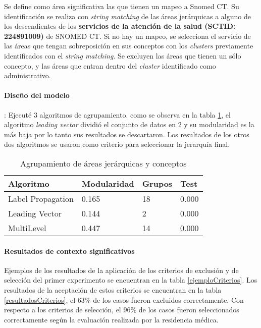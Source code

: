 Se define como área significativa las que tienen un mapeo a Snomed CT. Su identificación se realiza con \textit{string matching} de las áreas jerárquicas a  alguno de los descendientes de  los \textbf{servicios de la atención de la salud (SCTID: 224891009)} de SNOMED CT. Si no hay un mapeo, se selecciona el servicio de las áreas que tengan sobreposición en sus conceptos con los \textit{clusters} previamente identificados con el \textit{string matching}. Se excluyen las áreas que tienen un sólo concepto, y las áreas que entran dentro del \textit{cluster} identificado como administrativo. 

\paragraph{Diseño del modelo}: Ejecuté 3 algoritmos de agrupamiento. como se observa en la tabla \ref{clusteringAreas}, el algoritmo \textit{leading vector} dividió el conjunto de datos en 2 y su modularidad es la más baja por lo tanto sus resultados se descartaron.  Los resultados de los otros dos algoritmos se usaron como criterio para seleccionar la jerarquía final.

\begin{table}[htb]
\centering
\caption{Agrupamiento de áreas jerárquicas y conceptos}
\label{clusteringAreas}
\begin{tabular}{@{}llll@{}}
\toprule
Algoritmo         & Modularidad & Grupos & Test \\ \midrule
Label Propagation & 0.165       & 18     &   0.000   \\
Leading Vector    & 0.144       & 2      &     0.000 \\
MultiLevel        & 0.447       & 14     &     0.000 \\ \bottomrule
\end{tabular}
\end{table}

\paragraph{Resultados de contexto significativos}

Ejemplos de los resultados de la aplicación de los criterios de exclusión y de selección del primer experimento se encuentran en la tabla \ref{ejemploCriterios}. Los resultados de la aceptación de estos criterios se encuentran en la tabla \ref{resultadosCriterios}, el \num{63}\% de los casos fueron excluidos correctamente. Con respecto a los criterios de selección, el \num{96}\% de los casos fueron seleccionados correctamente según la evaluación realizada por la residencia médica.

